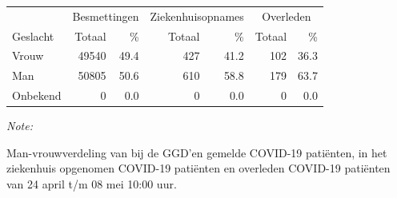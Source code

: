 \documentclass[
  english,
  man,floatsintext]{apa6}
\begin{document}
\begin{table}
\centering\begingroup\fontsize{11}{13}\selectfont

\begin{threeparttable}
\begin{tabular}{lrrrrrr}
\toprule
\multicolumn{1}{c}{ } & \multicolumn{2}{c}{Besmettingen} & \multicolumn{2}{c}{Ziekenhuisopnames} & \multicolumn{2}{c}{Overleden} \\
\cmidrule(l{3pt}r{3pt}){2-3} \cmidrule(l{3pt}r{3pt}){4-5} \cmidrule(l{3pt}r{3pt}){6-7}
Geslacht & Totaal & \% & Totaal & \% & Totaal & \%\\
\midrule
Vrouw & 49540 & 49.4 & 427 & 41.2 & 102 & 36.3\\
Man & 50805 & 50.6 & 610 & 58.8 & 179 & 63.7\\
Onbekend & 0 & 0.0 & 0 & 0.0 & 0 & 0.0\\
\bottomrule
\end{tabular}
\begin{tablenotes}
\item \textit{Note: } 
\item Man-vrouwverdeling van bij de GGD’en gemelde COVID-19 patiënten, in het ziekenhuis opgenomen COVID-19 patiënten en overleden COVID-19 patiënten van 24 april t/m 08 mei 10:00 uur.
\end{tablenotes}
\end{threeparttable}
\endgroup{}
\end{table}
\newpage
\end{document}
